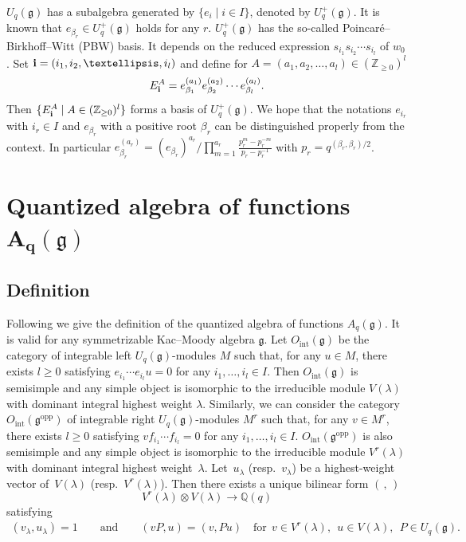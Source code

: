 \documentclass[11pt]{article}
\newcommand{\geh}{\mathfrak{g}}
\newcommand{\la}{\lambda}
\newcommand{\ot}{\otimes}
\newcommand{\Z}{{\mathbb Z}}
\newcommand{\Q}{{\mathbb Q}}
\begin{document}
$U_q(\geh)$ has a subalgebra generated by $\{e_i\mid i\in I\}$, denoted by $U_q^+(\geh)$.
It is known that $e_{\beta_r} \in U^+_q(\geh)$ holds for any $r$.
$U^+_q(\geh)$ has the
so-called Poincar\'e--Birkhof\/f--Witt (PBW) basis. It depends on the reduced expression
$s_{i_1}s_{i_2}\cdots s_{i_l}$ of $w_0$. Set ${\bf i}=(i_1,i_2,\ldots,i_l)$ and def\/ine for
$A=(a_1,a_2,\ldots,a_l)\in(\Z_{\ge0})^l$
\begin{gather}\label{a:Eai}
E_{\bf i}^A=e_{\beta_1}^{(a_1)}e_{\beta_2}^{(a_2)}\cdots e_{\beta_l}^{(a_l)}.
\end{gather}
Then $\{E_{\bf i}^A\mid A\in(\Z_{\ge0})^l\}$ forms a basis of $U_q^+(\geh)$.
We hope that the notations $e_{i_r}$ with $i_r \in I$ and
$e_{\beta_r}$ with a positive root $\beta_r$
can be distinguished properly from the context.
In particular $e^{(a_r)}_{\beta_r}
= (e_{\beta_r})^{a_r}/\prod\limits_{m=1}^{a_r}\frac{p_r^m-p^{-m}_r}{p_r-p_r^{-1}}$
with $p_r = q^{(\beta_r, \beta_r)/2}$.




\section[Quantized algebra of functions $A_q(\geh)$]{Quantized algebra of functions $\boldsymbol{A_q(\geh)}$}\label{a:sec3}

\subsection{Def\/inition}

Following \cite{Kas93}
we give the def\/inition of the quantized algebra of functions $A_q(\geh)$.
It is valid for any symmetrizable Kac--Moody algebra $\geh$. Let $O_\mathrm{int}(\geh)$ be the
category of integrable left $U_q(\geh)$-modules $M$ such that, for any $u\in M$, there exists $l\ge0$
satisfying $e_{i_1}\cdots e_{i_l}u=0$ for any $i_1,\ldots,i_l\in I$. Then $O_\mathrm{int}(\geh)$
is semisimple and any simple object is isomorphic to the irreducible module $V(\la)$ with
dominant integral highest weight $\la$.
Similarly, we can consider the category $O_\mathrm{int}(\geh^\mathrm{opp})$ of integrable
right $U_q(\geh)$-modules $M^r$ such that, for any $v\in M^r$, there exists $l\ge0$ satisfying
$vf_{i_1}\cdots f_{i_l}=0$ for any $i_1,\ldots,i_l\in I$. $O_\mathrm{int}(\geh^\mathrm{opp})$
is also semisimple and any simple object is isomorphic to the irreducible module $V^r(\la)$ with
dominant integral highest weight~$\la$. Let~$u_\la$ (resp.~$v_\la$) be a highest-weight vector
of~$V(\la)$ (resp.~$V^r(\la)$). Then there exists a unique bilinear form $(\,,\,)$
\[
V^r(\la)\ot V(\la)\rightarrow \Q(q)
\]
satisfying
\begin{gather*}
(v_\la,u_\la) =1\qquad\text{and}\qquad
(vP,u) =(v,Pu)\quad\text{for} \ \ v\in V^r(\la), \ \ u\in V(\la), \ \ P\in U_q(\geh).
\end{gather*}
\end{document}
